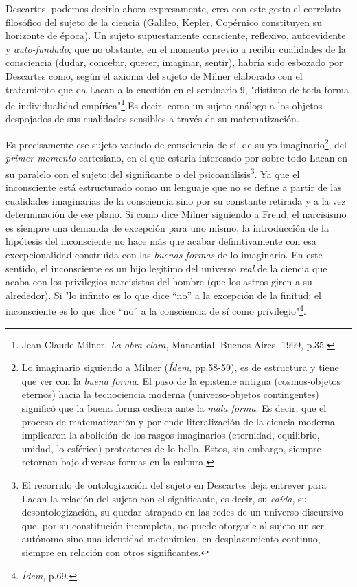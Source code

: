 \documentclass{book}
\begin{document}
Descartes, podemos decirlo ahora expresamente, crea con este gesto el
correlato filosófico del sujeto de la ciencia (Galileo, Kepler,
Copérnico constituyen su horizonte de época). Un sujeto supuestamente
consciente, reflexivo, autoevidente y \emph{auto-fundado}, que no
obstante, en el momento previo a recibir cualidades de la consciencia
(dudar, concebir, querer, imaginar, sentir), habría sido esbozado por
Descartes como, según el axioma del sujeto de Milner elaborado con el
tratamiento que da Lacan a la cuestión en el seminario 9, "distinto de
toda forma de individualidad empírica"\footnote{Jean-Claude Milner,
  \emph{La obra clara}, Manantial, Buenos Aires, 1999, p.35.}.Es decir,
como un sujeto análogo a los objetos despojados de sus cualidades
sensibles a través de su matematización.

Es precisamente ese sujeto vaciado de consciencia de sí, de su yo
imaginario\footnote{Lo imaginario siguiendo a Milner (\emph{Ídem},
  pp.58-59), es de estructura y tiene que ver con la \emph{buena forma}.
  El paso de la episteme antigua (cosmos-objetos eternos) hacia la
  tecnociencia moderna (universo-objetos contingentes) significó que la
  buena forma cediera ante la \emph{mala forma}. Es decir, que el
  proceso de matematización y por ende literalización de la ciencia
  moderna implicaron la abolición de los rasgos imaginarios (eternidad,
  equilibrio, unidad, lo esférico) protectores de lo bello. Estos, sin
  embargo, siempre retornan bajo diversas formas en la cultura.}, del
\emph{primer momento} cartesiano, en el que estaría interesado por sobre
todo Lacan en su paralelo con el sujeto del significante o del
psicoanálisis\footnote{El recorrido de ontologización del sujeto en
  Descartes deja entrever para Lacan la relación del sujeto con el
  significante, es decir, su \emph{caída}, su desontologización, su
  quedar atrapado en las redes de un universo discursivo que, por su
  constitución incompleta, no puede otorgarle al sujeto un ser autónomo
  sino una identidad metonímica, en desplazamiento continuo, siempre en
  relación con otros significantes.}. Ya que el inconsciente está
estructurado como un lenguaje que no se define a partir de las
cualidades imaginarias de la consciencia sino por su constante retirada
y a la vez determinación de ese plano. Si como dice Milner siguiendo a
Freud, el narcisismo es siempre una demanda de excepción para uno mismo,
la introducción de la hipótesis del inconsciente no hace más que acabar
definitivamente con esa excepcionalidad construida con las \emph{buenas
formas} de lo imaginario. En este sentido, el inconsciente es un hijo
legítimo del universo \emph{real} de la ciencia que acaba con los
privilegios narcisistas del hombre (que los astros giren a su
alrededor). Si "lo infinito es lo que dice ``no'' a la excepción de la
finitud; el inconsciente es lo que dice ``no'' a la consciencia de sí
como privilegio"\footnote{\emph{Ídem}, p.69.}.
\end{document}
